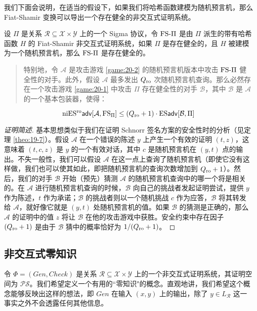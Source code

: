我们下面会说明，在适当的假设下，如果我们将哈希函数建模为随机预言机，那么 Fiat-Shamir 变换可以导出一个存在健全的非交互式证明系统。

\begin{theorem}
设 $\Pi$ 是关系 $\mathcal{R}\subseteq\mathcal{X}\times\mathcal{Y}$ 上的一个 Sigma 协议，令 ${\rm FS}\text{-}\Pi$ 是由 $\Pi$ 派生的带有哈希函数 $H$ 的 Fiat-Shamir 非交互式证明系统，如果 $\Pi$ 是存在健全的，且 $H$ 被建模为一个随机预言机，那么 ${\rm FS}\text{-}\Pi$ 是存在健全的。
\begin{quote}
特别地，令 $\mathcal{A}$ 是攻击游戏 \ref{game:20-2} 的随机预言机版本中攻击 ${\rm FS}\text{-}\Pi$ 健全性的对手。此外，假设 $\mathcal{A}$ 最多发出 $Q_{\rm ro}$ 次随机预言机查询。那么必然存在一个攻击游戏 \ref{game:20-1} 中攻击 $\Pi$ 存在健全性的对手 $\mathcal{B}$，其中 $\mathcal{B}$ 是 $\mathcal{A}$ 的一个基本包装器，使得：
\end{quote}
$$
{\rm niES^{ro}\mathsf{adv}}[\mathcal{A},{\rm FS}_\Pi]\leq(Q_{\rm ro}+1)\cdot{\rm ES\mathsf{adv}}[\mathcal{B},\Pi]
$$
\end{theorem}

\begin{proof}[证明简述]
基本思想类似于我们在证明 Schnorr 签名方案的安全性时的分析（见定理 \ref{theo:19-7}）。假设 $\mathcal{A}$ 在一个错误的陈述 $y$ 上产生一个有效的证明 $(t,z)$，这意味着 $(t,c,z)$ 是 $y$ 的一个有效对话，其中 $c$ 是随机预言机在 $(y,t)$ 点的输出。不失一般性，我们可以假设 $\mathcal{A}$ 在这一点上查询了随机预言机（即使它没有这样做，我们也可以使其如此，即把随机预言机的查询次数增加到 $Q_{\rm ro}+1$）。然后，我们的对手 $\mathcal{B}$ 开始（预先）猜测 $\mathcal{A}$ 的随机预言机查询中的哪一个将是相关的。在 $\mathcal{A}$ 进行随机预言机查询的时候，$\mathcal{B}$ 向自己的挑战者发起证明尝试，提供 $y$ 作为陈述，$t$ 作为承诺；$\mathcal{B}$ 的挑战者则以一个随机挑战 $c$ 作为应答，$\mathcal{B}$ 将其转发给 $\mathcal{A}$，就好像它就是 $(y,t)$ 处随机预言机的值。如果 $\mathcal{B}$ 的猜测是正确的，那么 $\mathcal{A}$ 的证明中的值 $z$ 将让 $\mathcal{B}$ 在他的攻击游戏中获胜。安全约束中存在因子 $(Q_{\rm ro}+1)$ 是由于 $\mathcal{B}$ 猜中的概率恰好为 ${1}/{(Q_{\rm ro}+1)}$。
\end{proof}

\subsection{非交互式零知识}

令 $\Phi=(Gen,Check)$ 是关系 $\mathcal{R}\subseteq\mathcal{X}\times\mathcal{Y}$ 上的一个非交互式证明系统，其证明空间为 $\mathcal{PS}$。我们希望定义一个有用的``零知识"的概念。直观地讲，我们希望这个概念能够反映出这样的想法，即 $Gen$ 在输入 $(x,y)$ 上的输出，除了 $y\in L_{\mathcal R}$ 这一事实之外不会透露任何其他信息。

